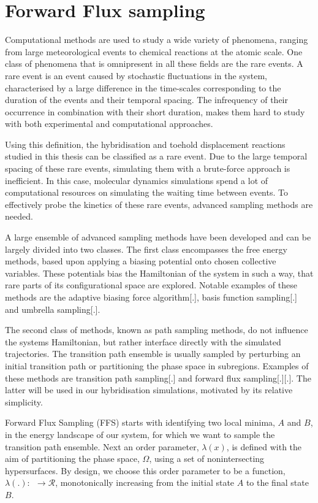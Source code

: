 \section{Forward Flux sampling}

Computational methods are used to study a wide variety of phenomena, ranging from
large meteorological events to chemical reactions at the atomic scale. One class of
phenomena that is omnipresent in all these fields are the rare events. A rare event is an
event caused by stochastic fluctuations in the system, characterised by a large
difference in the time-scales corresponding to the duration of the events and their
temporal spacing. The infrequency of their occurrence in combination with their short
duration, makes them hard to study with both experimental and computational approaches.

Using this definition, the hybridisation and toehold displacement reactions studied in
this thesis can be classified as a rare event. Due to
the large temporal spacing of these rare events, simulating them with a brute-force
approach is inefficient. In this case, molecular dynamics simulations spend a lot of
computational resources on simulating the waiting time between events. To
effectively probe the kinetics of these rare events, advanced sampling methods are
needed.

A large ensemble of advanced sampling methods have been developed and can be largely
divided into two classes. The first class encompasses the free energy methods, based upon
applying a biasing potential onto chosen collective variables. These potentials bias the
Hamiltonian of the system in such a way, that rare parts of its configurational space are
explored. Notable examples of these methods are the adaptive biasing force algorithm[.],
basis function sampling[.] and umbrella sampling[.]. %

The second class of methods, known as path sampling methods, do not influence the
systems Hamiltonian, but rather interface directly with the simulated trajectories. The
transition path ensemble is usually sampled by perturbing an initial transition path or
partitioning the phase space in subregions. Examples of these methods are transition
path sampling[.] and forward flux sampling[.][.]. The latter will be used in our
hybridisation simulations, motivated by its relative simplicity.

Forward Flux Sampling (FFS) starts with identifying two local minima, $A$ and $B$, in the
energy landscape of our system, for which we want to sample the transition path ensemble.
Next an order parameter, $\lambda(x)$, is defined with the aim of partitioning the
phase space, $\Omega$, using a set of nonintersecting hypersurfaces. By design, we
choose this order parameter to be a function, $\lambda(.):\ $\Omega$\ \rightarrow
\mathcal{R}$, monotonically increasing from the initial state $A$ to the final
state $B$.

